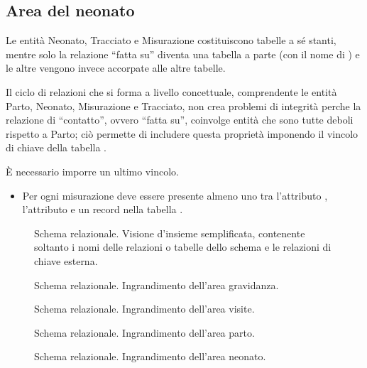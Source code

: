 \subsection{Area del neonato}
\label{logicalnewborn}

Le entità Neonato, Tracciato e Misurazione costituiscono tabelle a sé stanti, mentre solo la relazione \enquote{fatta su} diventa una tabella a parte (con il nome di ) e le altre vengono invece accorpate alle altre tabelle.

Il ciclo di relazioni che si forma a livello concettuale, comprendente le entità Parto, Neonato, Misurazione e Tracciato, non crea problemi di integrità perche la relazione di \enquote{contatto}, ovvero \enquote{fatta su}, coinvolge entità che sono tutte deboli rispetto a Parto; ciò permette di includere questa proprietà imponendo il vincolo di chiave della tabella .

È necessario imporre un ultimo vincolo.
\begin{itemize}
\item[\Con{}] Per ogni misurazione deve essere presente almeno uno tra l'attributo , l'attributo  e un record nella tabella .
\end{itemize}

\begin{figure}
    \centering
    
    \caption{Schema relazionale. Visione d'insieme semplificata, contenente soltanto i nomi delle relazioni o tabelle dello schema e le relazioni di chiave esterna.}
\label{completereldiagram}
\end{figure}

\begin{figure}
    \centering
    
    \caption{Schema relazionale. Ingrandimento dell'area gravidanza.}
\label{pregnancyreldiagram}
\end{figure}

\begin{figure}
    \centering
    
    \caption{Schema relazionale. Ingrandimento dell'area visite.}
\label{visitsreldiagram}
\end{figure}

\begin{figure}
    \centering
    
    \caption{Schema relazionale. Ingrandimento dell'area parto.}
\label{deliveryreldiagram}
\end{figure}

\begin{figure}
    \centering
    
    \caption{Schema relazionale. Ingrandimento dell'area neonato.}
\label{newbornreldiagram}
\end{figure}

